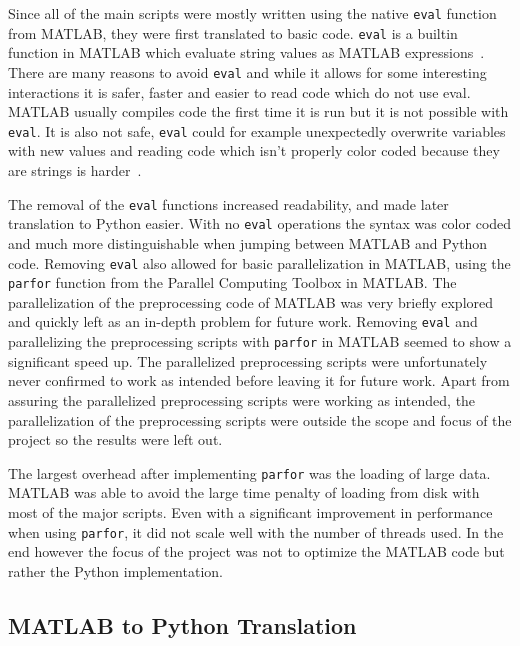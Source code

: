 \documentclass[12pt, a4paper]{article}
\begin{document}
Since all of the main scripts were mostly written using the native \texttt{eval} function from MATLAB, they were first translated to basic code.
\texttt{eval} is a builtin function in MATLAB which evaluate string values as MATLAB expressions~\cite{mat:eval}.
There are many reasons to avoid \texttt{eval} and while it allows for some interesting interactions it is safer, faster and easier to read code which do not use eval.
MATLAB usually compiles code the first time it is run but it is not possible with \texttt{eval}.
It is also not safe, \texttt{eval} could for example unexpectedly overwrite variables with new values and reading code which isn't properly color coded because they are strings is harder~\cite{matEval}.

The removal of the \texttt{eval} functions increased readability, and made later translation to Python easier. With no \texttt{eval} operations the syntax was color coded and much more distinguishable when jumping between MATLAB and Python code.
Removing \texttt{eval} also allowed for basic parallelization in MATLAB, using the \texttt{parfor} function from the Parallel Computing Toolbox in MATLAB.
The parallelization of the preprocessing code of MATLAB was very briefly explored and quickly left as an in-depth problem for future work.
Removing \texttt{eval} and parallelizing the preprocessing scripts with \texttt{parfor} in MATLAB seemed to show a significant speed up.
The parallelized preprocessing scripts were unfortunately never confirmed to work as intended before leaving it for future work.
Apart from assuring the parallelized preprocessing scripts were working as intended, the parallelization of the preprocessing scripts were outside the scope and focus of the project so the results were left out.

The largest overhead after implementing \texttt{parfor} was the loading of large data. 
MATLAB was able to avoid the large time penalty of loading from disk with most of the major scripts.
Even with a significant improvement in performance when using \texttt{parfor}, it did not scale well with the number of threads used.
In the end however the focus of the project was not to optimize the MATLAB code but rather the Python implementation.


\subsection{MATLAB to Python Translation}\label{MATPYConv}
\end{document}
